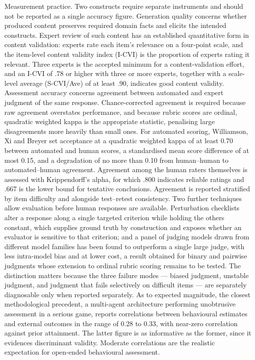 Measurement practice. Two constructs require separate instruments and should not be reported as a single accuracy figure. Generation quality concerns whether produced content preserves required domain facts and elicits the intended constructs. Expert review of such content has an established quantitative form in content validation: experts rate each item's relevance on a four-point scale, and the item-level content validity index (I-CVI) is the proportion of experts rating it relevant. Three experts is the accepted minimum for a content-\allowbreak{}validation effort\cite{r69,r70}, and an I-CVI of .78 or higher with three or more experts, together with a scale-level average (S-CVI/Ave) of at least .90, indicates good content validity\cite{r70}. Assessment accuracy concerns agreement between automated and expert judgment of the same response. Chance-\allowbreak{}corrected agreement is required because raw agreement overstates performance, and because rubric scores are ordinal, quadratic weighted kappa is the appropriate statistic, penalising large disagreements more heavily than small ones. For automated scoring, Williamson, Xi and Breyer\cite{r71} set acceptance at a quadratic weighted kappa of at least 0.70 between automated and human scores, a standardised mean score difference of at most 0.15, and a degradation of no more than 0.10 from human--human to automated--human agreement. Agreement among the human raters themselves is assessed with Krippendorff's alpha, for which .800 indicates reliable ratings and .667 is the lower bound for tentative conclusions\cite{r72}. Agreement is reported stratified by item difficulty and alongside test--retest consistency. Two further techniques allow evaluation before human responses are available. Perturbation checklists alter a response along a single targeted criterion while holding the others constant, which supplies ground truth by construction and exposes whether an evaluator is sensitive to that criterion\cite{r73}; and a panel of judging models drawn from different model families has been found to outperform a single large judge, with less intra-model bias and at lower cost\cite{r74}, a result obtained for binary and pairwise judgments whose extension to ordinal rubric scoring remains to be tested. The distinction matters because the three failure modes --- biased judgment, unstable judgment, and judgment that fails selectively on difficult items --- are separately diagnosable only when reported separately. As to expected magnitude, the closest methodological precedent, a multi-agent architecture performing unobtrusive assessment in a serious game, reports correlations between behavioural estimates and external outcomes in the range of 0.28 to 0.33, with near-zero correlation against prior attainment\cite{r75}. The latter figure is as informative as the former, since it evidences discriminant validity. Moderate correlations are the realistic expectation for open-ended behavioural assessment.

